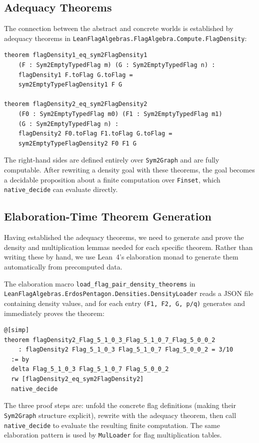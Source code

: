 \documentclass{article}
\newcommand{\lean}[1]{\texttt{#1}}
\begin{document}
\subsection{Adequacy Theorems}

The connection between the abstract and concrete worlds is established by
adequacy theorems in \lean{LeanFlagAlgebras.FlagAlgebra.Compute.FlagDensity}:

\begin{lstlisting}
theorem flagDensity1_eq_sym2FlagDensity1
    (F : Sym2EmptyTypedFlag m) (G : Sym2EmptyTypedFlag n) :
    flagDensity1 F.toFlag G.toFlag =
    sym2EmptyTypeFlagDensity1 F G

theorem flagDensity2_eq_sym2FlagDensity2
    (F0 : Sym2EmptyTypedFlag m0) (F1 : Sym2EmptyTypedFlag m1)
    (G : Sym2EmptyTypedFlag n) :
    flagDensity2 F0.toFlag F1.toFlag G.toFlag =
    sym2EmptyTypeFlagDensity2 F0 F1 G
\end{lstlisting}
The right-hand sides are defined entirely over \lean{Sym2Graph}
and are fully computable.  After rewriting a density goal with these theorems,
the goal becomes a decidable proposition about a finite computation over
\lean{Finset}, which \lean{native\_decide} can evaluate directly.

\subsection{Elaboration-Time Theorem Generation}

Having established the adequacy theorems, we need to generate and prove the
density and multiplication lemmas needed for each specific theorem.  Rather
than writing these by hand, we use Lean~4's elaboration monad to generate them
automatically from precomputed data.

The elaboration macro \lean{load\_flag\_pair\_density\_theorems} in
\lean{LeanFlagAlgebras.ErdosPentagon.Densities.DensityLoader} reads a JSON
file containing density values, and for each entry \lean{(F1, F2, G, p/q)}
generates and immediately proves the theorem:
\begin{lstlisting}
@[simp]
theorem flagDensity2_Flag_5_1_0_3_Flag_5_1_0_7_Flag_5_0_0_2
    : flagDensity2 Flag_5_1_0_3 Flag_5_1_0_7 Flag_5_0_0_2 = 3/10
  := by
  delta Flag_5_1_0_3 Flag_5_1_0_7 Flag_5_0_0_2
  rw [flagDensity2_eq_sym2FlagDensity2]
  native_decide
\end{lstlisting}
The three proof steps are: unfold the concrete flag definitions (making their
\lean{Sym2Graph} structure explicit), rewrite with the adequacy theorem, then
call \lean{native\_decide} to evaluate the resulting finite computation.
The same elaboration pattern is used by \lean{MulLoader} for flag multiplication tables.
\end{document}
